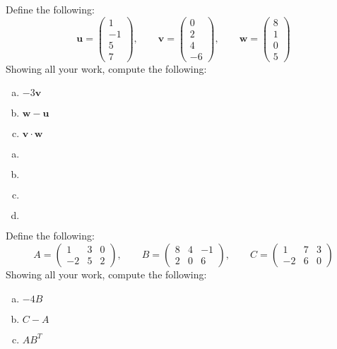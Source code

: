 \documentclass[11pt,letterpaper]{article}
\begin{document}

 Define the following:
	\[
	\mathbf{u}= \begin{pmatrix} 1 \\ -1 \\ 5 \\ 7 \end{pmatrix}, \qquad
	\mathbf{v}= \begin{pmatrix} 0 \\ 2 \\ 4 \\ -6 \end{pmatrix}, \qquad
	\mathbf{w}= \begin{pmatrix} 8 \\ 1 \\ 0 \\5 \end{pmatrix}
	\]
Showing all your work, compute the following:
	\begin{enumerate}[(a)]
	\item $-3\mathbf{v}$
	\item $\mathbf{w} - \mathbf{u}$
	\item $\mathbf{v} \cdot \mathbf{w}$
	\end{enumerate} \pspace

\sol 
\begin{enumerate}[(a)]
\item 
	\[
	
	\]

\item 
	\[
	
	\]

\item 
	\[
	
	\]

\item 
	\[
	
	\]
\end{enumerate}



\newpage



 Define the following:
	\[
	A= \begin{pmatrix} 1 & 3 & 0 \\ -2 & 5 & 2 \end{pmatrix}, \qquad
	B= \begin{pmatrix} 8 & 4 & -1 \\ 2 & 0 & 6 \end{pmatrix}, \qquad
	C= \begin{pmatrix} 1 & 7 & 3 \\ -2 & 6 & 0 \end{pmatrix}
	\]
Showing all your work, compute the following:
	\begin{enumerate}[(a)]
	\item $-4B$
	\item $C - A$
	\item $AB^T$
	\end{enumerate} \pspace
	
\end{document}

